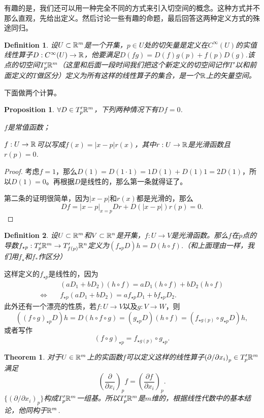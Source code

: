 \documentclass[8pt]{book}
\theoremstyle{plain}%
\newtheorem{pro}{Proposition}[section]%
\newtheorem{theo}{Theorem}[section]%
\newtheorem{defi}{Definition}[section]%
\begin{document}
有趣的是，我们还可以用一种完全不同的方式来引入切空间的概念。这种方式并不那么直观，先给出定义。然后讨论一些有趣的命题，最后回答这两种定义方式的殊途同归。
\begin{defi}
	设$U \subset \mathbb{R}^m$是一个开集，$p\in U$处的切矢量是定义在$C^\infty(U)$的实值线性算子$D:C^\infty(U)\to \mathbb{R}$，他要满足$D(fg)=D(f)g(p)+f(p)D(g)$.该点的切空间$T'_p\mathbb{R}^m$（这里和后面一段时间我们把这个新定义的切空间记作$T'$以和前面定义的$T$做区分）定义为所有这样的线性算子的集合，是一个$\mathbb{R}$上的矢量空间。
\end{defi}
下面做两个计算。
\begin{pro}
$\forall D \in T'_p\mathbb{R}^m$，下列两种情况下有$Df=0$.

$f$是常值函数；

$f:U \to \mathbb{R}$可以写成$f(x)=|x-p|r(x)$，其中$r:U\to \mathbb{R}$是光滑函数且$r(p)=0$.
\end{pro}
\begin{proof}
	考虑$f=1$，那么$D(1)=D(1\cdot1)=1D(1)+D(1)1=2D(1)$，所以$D(1)=0$。再根据$D$是线性的，那么第一条就得证了。

	第二条的证明很简单，因为$|x-p|$和$r(x)$都是光滑的，那么
	\[
		Df=|x-p|_{x=p}Dr+D(|x-p|)r(p)=0.
	\]
\end{proof}
\begin{defi}
	设$U \subset \mathbb{R}^m$和$V \subset \mathbb{R}^n$是开集，$f:U\to V$是光滑函数。那么$f$在$p$点的导数$f_{\star p}:T'_p\mathbb{R}^m \to T'_{f(p)}\mathbb{R}^n$定义为$(f_{\star p}D)h=D(h\circ f)$.（和上面理由一样，我们用$f_\star$和$f_*$作区分）
\end{defi}
这样定义的$f_{\star p}$是线性的，因为
\[
	\begin{split}
		&(aD_1+bD_2)(h\circ f)=aD_1(h\circ f)+bD_2(h\circ f)\\
		\Leftrightarrow\quad &f_{\star p}(aD_1+bD_2)=af_{\star p}D_1+bf_{\star p}D_2.
	\end{split}
\]
此外还有一个漂亮的性质，若$f:U\to V$以及$g:V\to W$，则
\[
	\left((f\circ g)_{\star p}D\right)h=D(h\circ f\circ g)=(g_{\star p}D)(h\circ f)=\left(f_{\star g(p)}\circ g_{\star p}D\right)h,
\]
或者写作
\[
	(f\circ g)_{\star p}=f_{\star g(p)}\circ g_{\star p}.
\]
\begin{theo}
	对于$U\in \mathbb{R}^m$上的实函数$f$可以定义这样的线性算子$\left(\partial/\partial x_i\right)_p\in T'_p\mathbb{R}^m$满足
	\[
		\left(\frac{\partial}{\partial x_i}\right)_p f=\left(\frac{\partial f}{\partial x_i}\right)_p.
	\]
	$\{\left(\partial/\partial x_i\right)_p\}$构成$T'_p\mathbb{R}^m$一组基。所以$T'_p\mathbb{R}^m$是$m$维的，根据线性代数中的基本结论，他同构于$\mathbb{R}^m$.
\end{theo}
\end{document}
